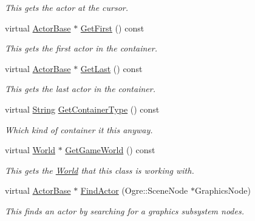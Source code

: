 \begin{DoxyCompactItemize}
\begin{DoxyCompactList}\small\item\em This gets the actor at the cursor. \item\end{DoxyCompactList}\item 
virtual \hyperlink{classphys_1_1ActorBase}{ActorBase} $\ast$ \hyperlink{classphys_1_1ActorContainerVector_a55ceecd017455f3185aa62798811e3c6}{GetFirst} () const 
\begin{DoxyCompactList}\small\item\em This gets the first actor in the container. \item\end{DoxyCompactList}\item 
virtual \hyperlink{classphys_1_1ActorBase}{ActorBase} $\ast$ \hyperlink{classphys_1_1ActorContainerVector_a211f6e419ef0b753cecf2c662a54511e}{GetLast} () const 
\begin{DoxyCompactList}\small\item\em This gets the last actor in the container. \item\end{DoxyCompactList}\item 
virtual \hyperlink{namespacephys_aa03900411993de7fbfec4789bc1d392e}{String} \hyperlink{classphys_1_1ActorContainerVector_ae18c29b30d840e0f4fc9b553dd5ca32c}{GetContainerType} () const 
\begin{DoxyCompactList}\small\item\em Which kind of container it this anyway. \item\end{DoxyCompactList}\item 
virtual \hyperlink{classphys_1_1World}{World} $\ast$ \hyperlink{classphys_1_1ActorContainerVector_a5519eb0000073a2f397e158bfc368349}{GetGameWorld} () const 
\begin{DoxyCompactList}\small\item\em This gets the \hyperlink{classphys_1_1World}{World} that this class is working with. \item\end{DoxyCompactList}\item 
virtual \hyperlink{classphys_1_1ActorBase}{ActorBase} $\ast$ \hyperlink{classphys_1_1ActorContainerVector_a99ea0e27153c0a652264853fca7cd1b1}{FindActor} (Ogre::SceneNode $\ast$GraphicsNode)
\begin{DoxyCompactList}\small\item\em This finds an actor by searching for a graphics subsystem nodes. \item\end{DoxyCompactList}\item 

\end{DoxyCompactItemize}
